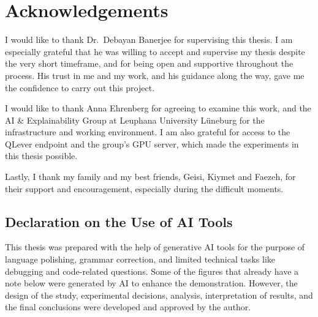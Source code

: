 \chapter*{Acknowledgements}

I would like to thank Dr.\ Debayan Banerjee for supervising this thesis.
I am especially grateful that he was willing to accept and supervise my thesis despite the very short timeframe, and for being open and supportive throughout the process.
His trust in me and my work, and his guidance along the way, gave me the confidence to carry out this project.

I would like to thank Anna Ehrenberg for agreeing to examine this work, and the AI \& Explainability Group at Leuphana University Lüneburg for the infrastructure and working environment.
I am also grateful for access to the QLever endpoint and the group's GPU server, which made the experiments in this thesis possible.

Lastly, I thank my family and my best friends, Geisi, Kiymet and Faezeh, for their support and encouragement, especially during the difficult moments.

\bigskip
\bigskip
\bigskip
\bigskip
\bigskip

\section*{Declaration on the Use of AI Tools}

\bigskip
This thesis was prepared with the help of generative AI tools for the purpose of language polishing, grammar correction, and limited technical tasks like debugging and code-related questions. Some of the figures that already have a note below were generated by AI to enhance the demonstration. However, the design of the study, experimental decisions, analysis, interpretation of results, and the final conclusions were developed and approved by the author.
